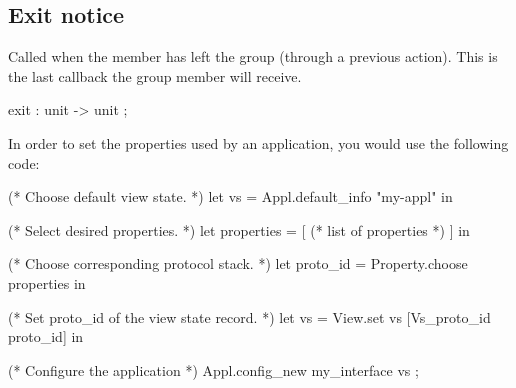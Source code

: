 \subsection{Exit notice}
Called when the member has left the group (through a previous 
action).  This is the last callback the group member will receive.
\begin{codebox}
  exit                  : unit -> unit ;
\end{codebox}



In order to set the properties used by an application, you would use the
following code:
\begin{codebox}
  (* Choose default view state.
   *)
  let vs = Appl.default_info "my-appl" in

  (* Select desired properties.
   *)
  let properties = [ (* list of properties *) ] in

  (* Choose corresponding protocol stack.
   *)
  let proto_id = Property.choose properties in

  (* Set proto_id of the view state record.
   *)
  let vs = View.set vs [Vs_proto_id proto_id] in

  (* Configure the application
   *)
  Appl.config_new my_interface vs ;
\end{codebox}

